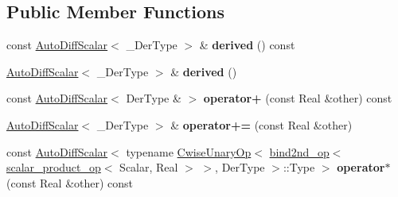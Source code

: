 \subsection*{Public Member Functions}
\begin{DoxyCompactItemize}
\item 
\mbox{\label{struct_eigen_1_1internal_1_1auto__diff__special__op_3_01___der_type_00_01true_01_4_a4d015a4f854641d4eec88e264275c923}} 
const \hyperlink{class_eigen_1_1_auto_diff_scalar}{Auto\+Diff\+Scalar}$<$ \+\_\+\+Der\+Type $>$ \& {\bfseries derived} () const
\item 
\mbox{\label{struct_eigen_1_1internal_1_1auto__diff__special__op_3_01___der_type_00_01true_01_4_a5c6949d0ee9847594297742a2b811108}} 
\hyperlink{class_eigen_1_1_auto_diff_scalar}{Auto\+Diff\+Scalar}$<$ \+\_\+\+Der\+Type $>$ \& {\bfseries derived} ()
\item 
\mbox{\label{struct_eigen_1_1internal_1_1auto__diff__special__op_3_01___der_type_00_01true_01_4_abcb4d68e0c6a75022965465fa6f6c36b}} 
const \hyperlink{class_eigen_1_1_auto_diff_scalar}{Auto\+Diff\+Scalar}$<$ Der\+Type \& $>$ {\bfseries operator+} (const Real \&other) const
\item 
\mbox{\label{struct_eigen_1_1internal_1_1auto__diff__special__op_3_01___der_type_00_01true_01_4_ae03416669027ee8c621ae40467e27da6}} 
\hyperlink{class_eigen_1_1_auto_diff_scalar}{Auto\+Diff\+Scalar}$<$ \+\_\+\+Der\+Type $>$ \& {\bfseries operator+=} (const Real \&other)
\item 
\mbox{\label{struct_eigen_1_1internal_1_1auto__diff__special__op_3_01___der_type_00_01true_01_4_a6516e027454f9dbf3fa633d5dcc64323}} 
const \hyperlink{class_eigen_1_1_auto_diff_scalar}{Auto\+Diff\+Scalar}$<$ typename \hyperlink{group___core___module_class_eigen_1_1_cwise_unary_op}{Cwise\+Unary\+Op}$<$ \hyperlink{struct_eigen_1_1internal_1_1bind2nd__op}{bind2nd\+\_\+op}$<$ \hyperlink{struct_eigen_1_1internal_1_1scalar__product__op}{scalar\+\_\+product\+\_\+op}$<$ Scalar, Real $>$ $>$, Der\+Type $>$\+::Type $>$ {\bfseries operator$\ast$} (const Real \&other) const

\end{DoxyCompactItemize}
